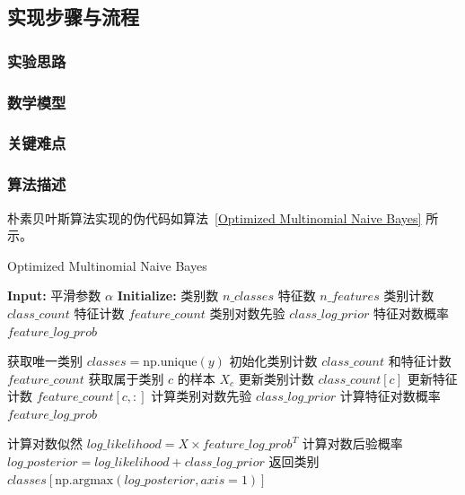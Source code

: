 \documentclass[12pt]{article}
\begin{document}
\subsection{实现步骤与流程}
\subsubsection{实验思路}


\subsubsection{数学模型}


\subsubsection{关键难点}


\subsubsection{算法描述}
朴素贝叶斯算法实现的伪代码如算法~\ref{Optimized Multinomial Naive Bayes} 所示。
\begin{algorithm}
  \caption{Optimized Multinomial Naive Bayes}
  \label{Optimized Multinomial Naive Bayes}
  \begin{algorithmic}[1]
    \State \textbf{Input:} 平滑参数 $\alpha$
    \State \textbf{Initialize:}
    \State \quad 类别数 $n\_classes$
    \State \quad 特征数 $n\_features$
    \State \quad 类别计数 $class\_count$
    \State \quad 特征计数 $feature\_count$
    \State \quad 类别对数先验 $class\_log\_prior$
    \State \quad 特征对数概率 $feature\_log\_prob$

    \State 获取唯一类别 $classes = \text{np.unique}(y)$
    \State 初始化类别计数 $class\_count$ 和特征计数 $feature\_count$
    \State 获取属于类别 $c$ 的样本 $X_c$
    \State 更新类别计数 $class\_count[c]$
    \State 更新特征计数 $feature\_count[c, :]$
    \EndFor
    \State 计算类别对数先验 $class\_log\_prior$
    \State 计算特征对数概率 $feature\_log\_prob$
    \EndProcedure

    \State 计算对数似然 $log\_likelihood = X \times feature\_log\_prob^T$
    \State 计算对数后验概率 $log\_posterior = log\_likelihood + class\_log\_prior$
    \State 返回类别 $classes[\text{np.argmax}(log\_posterior, axis=1)]$
    \EndProcedure

  \end{algorithmic}
\end{algorithm}
\end{document}
